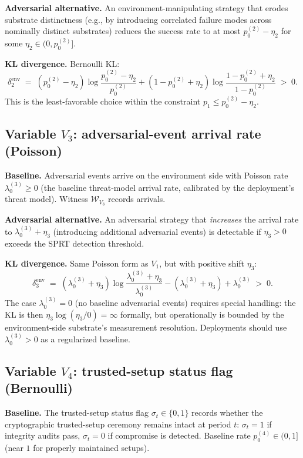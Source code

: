 \documentclass{article}
\newcommand{\Witness}{\mathcal{W}}
\begin{document}
\textbf{Adversarial alternative.}  An environment-manipulating
strategy that erodes substrate distinctness (e.g., by introducing
correlated failure modes across nominally distinct substrates)
reduces the success rate to at most $p_0^{(2)} - \eta_2$ for some
$\eta_2 \in (0, p_0^{(2)}]$.

\textbf{KL divergence.}  Bernoulli KL:
\[
  \delta_2^{\mathrm{env}} \;=\; (p_0^{(2)} - \eta_2)
  \log\!\frac{p_0^{(2)} - \eta_2}{p_0^{(2)}} +
  (1 - p_0^{(2)} + \eta_2) \log\!\frac{1 - p_0^{(2)} + \eta_2}
  {1 - p_0^{(2)}} \;>\; 0.
\]
This is the least-favorable choice within the constraint
$p_1 \leq p_0^{(2)} - \eta_2$.

\subsection{Variable $V_3$: adversarial-event arrival rate
(Poisson)}

\textbf{Baseline.}  Adversarial events arrive on the environment
side with Poisson rate $\lambda_0^{(3)} \geq 0$ (the baseline
threat-model arrival rate, calibrated by the deployment's threat
model).  Witness $\Witness_{V_3}$ records arrivals.

\textbf{Adversarial alternative.}  An adversarial strategy that
\emph{increases} the arrival rate to $\lambda_0^{(3)} + \eta_3$
(introducing additional adversarial events) is detectable if
$\eta_3 > 0$ exceeds the SPRT detection threshold.

\textbf{KL divergence.}  Same Poisson form as $V_1$, but with
positive shift $\eta_3$:
\[
  \delta_3^{\mathrm{env}} \;=\; (\lambda_0^{(3)} + \eta_3)
  \log\!\frac{\lambda_0^{(3)} + \eta_3}{\lambda_0^{(3)}} -
  (\lambda_0^{(3)} + \eta_3) + \lambda_0^{(3)} \;>\; 0.
\]
The case $\lambda_0^{(3)} = 0$ (no baseline adversarial events)
requires special handling: the KL is then $\eta_3 \log(\eta_3 / 0)
= \infty$ formally, but operationally is bounded by the
environment-side substrate's measurement resolution.  Deployments
should use $\lambda_0^{(3)} > 0$ as a regularized baseline.

\subsection{Variable $V_4$: trusted-setup status flag (Bernoulli)}

\textbf{Baseline.}  The trusted-setup status flag $\sigma_t \in
\{0, 1\}$ records whether the cryptographic trusted-setup ceremony
remains intact at period $t$: $\sigma_t = 1$ if integrity audits
pass, $\sigma_t = 0$ if compromise is detected.  Baseline rate
$p_0^{(4)} \in (0, 1]$ (near $1$ for properly maintained setups).
\end{document}
